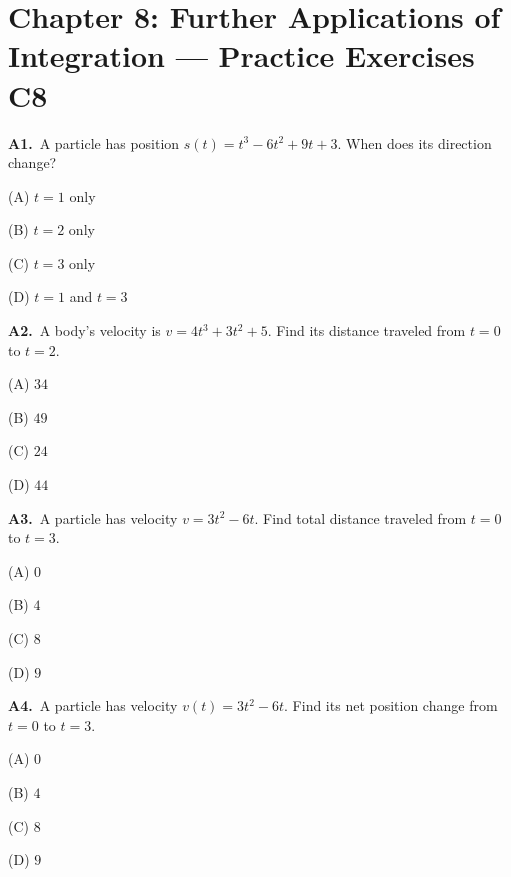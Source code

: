 \documentclass[11pt]{article}
\begin{document}
\section*{Chapter 8: Further Applications of Integration --- Practice Exercises C8}

\bigskip\noindent\textbf{A1.}\ A particle has position $s(t)=t^3-6t^2+9t+3$. When does its direction change?
\begin{list}{}{\setlength{\leftmargin}{3em}\setlength{\labelwidth}{2.5em}\setlength{\itemsep}{0pt}\setlength{\topsep}{2pt}}
\item[(A)] $t=1$ only
\item[(B)] $t=2$ only
\item[(C)] $t=3$ only
\item[(D)] $t=1$ and $t=3$
\end{list}

\bigskip\noindent\textbf{A2.}\ A body's velocity is $v=4t^3+3t^2+5$. Find its distance traveled from $t=0$ to $t=2$.
\begin{list}{}{\setlength{\leftmargin}{3em}\setlength{\labelwidth}{2.5em}\setlength{\itemsep}{0pt}\setlength{\topsep}{2pt}}
\item[(A)] $34$
\item[(B)] $49$
\item[(C)] $24$
\item[(D)] $44$
\end{list}

\bigskip\noindent\textbf{A3.}\ A particle has velocity $v=3t^2-6t$. Find total distance traveled from $t=0$ to $t=3$.
\begin{list}{}{\setlength{\leftmargin}{3em}\setlength{\labelwidth}{2.5em}\setlength{\itemsep}{0pt}\setlength{\topsep}{2pt}}
\item[(A)] $0$
\item[(B)] $4$
\item[(C)] $8$
\item[(D)] $9$
\end{list}

\bigskip\noindent\textbf{A4.}\ A particle has velocity $v(t)=3t^2-6t$. Find its net position change from $t=0$ to $t=3$.
\begin{list}{}{\setlength{\leftmargin}{3em}\setlength{\labelwidth}{2.5em}\setlength{\itemsep}{0pt}\setlength{\topsep}{2pt}}
\item[(A)] $0$
\item[(B)] $4$
\item[(C)] $8$
\item[(D)] $9$
\end{list}
\end{document}
